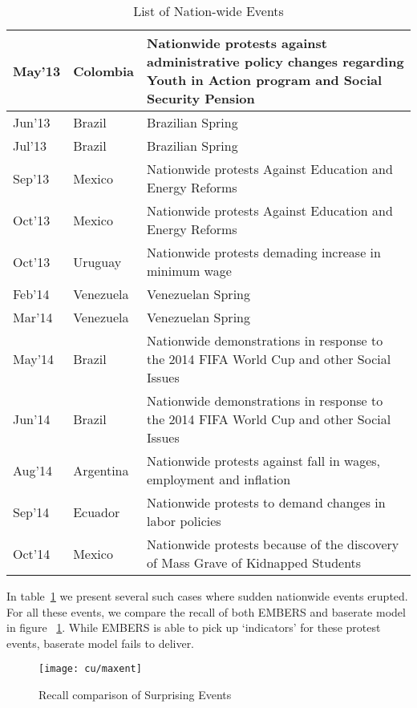 \begin{table}
\caption{List of Nation-wide Events}
\renewcommand{\arraystretch}{1.1}
\vspace{-3mm}
 \centering
 \begin{tabular}{|l|l|m{6cm}|}
 
 \hline
May'13  &  Colombia	 &  Nationwide protests against administrative policy changes regarding Youth in Action program and Social Security Pension \\ \hline
Jun'13  &  Brazil  &  Brazilian Spring \\ \hline
Jul'13  &  Brazil  &  Brazilian Spring \\ \hline
Sep'13  &  Mexico  &  Nationwide protests Against Education and Energy Reforms \\ \hline
Oct'13  &  Mexico  &  Nationwide protests Against Education and Energy Reforms \\ \hline
Oct'13  &  Uruguay  &  Nationwide protests demading increase in minimum wage \\ \hline
Feb'14  &  Venezuela	  &  Venezuelan Spring \\ \hline
Mar'14  &  Venezuela  &  	Venezuelan Spring \\ \hline
May'14  &  Brazil  &  Nationwide demonstrations in response to the 2014 FIFA World Cup and other Social Issues \\ \hline
Jun'14  &  Brazil  &  Nationwide demonstrations in response to the 2014 FIFA World Cup and other Social Issues \\ \hline
Aug'14  &  Argentina	  &  Nationwide protests against fall in wages, employment and inflation \\ \hline
Sep'14  &  Ecuador  &  Nationwide protests to demand changes in labor policies \\ \hline
Oct'14  &  Mexico  &  Nationwide protests because of the discovery of Mass Grave of Kidnapped Students  \\ \hline
\end{tabular}
\vspace{-5mm}
\label{tab:maxentEvents}
\end{table}

In table~\ref{tab:maxentEvents} we present several such cases where sudden nationwide events erupted. For all these events, we compare the recall of both EMBERS and baserate model in figure ~\ref{fig:maxent}. While EMBERS is able to pick up `{indicators}' for these protest events, baserate model fails to deliver.

\begin{figure}[H]
\centering
\texttt{[image: cu/maxent]}
\caption{Recall comparison of Surprising Events}
\label{fig:maxent}
\end{figure}